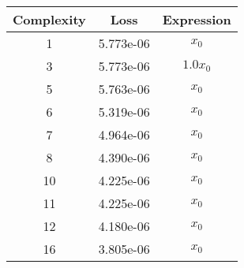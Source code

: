 \begin{center}
        \begin{tabular}{|c|c|c|}
        \hline
        Complexity & Loss & Expression \\
        \hline
        1 & 5.773e-06 & $\begin{aligned}x_{0}\end{aligned}$\\ \hline3 & 5.773e-06 & $\begin{aligned}1.0 x_{0}\end{aligned}$\\ \hline5 & 5.763e-06 & $\begin{aligned}x_{0}\end{aligned}$\\ \hline6 & 5.319e-06 & $\begin{aligned}x_{0}\end{aligned}$\\ \hline7 & 4.964e-06 & $\begin{aligned}x_{0}\end{aligned}$\\ \hline8 & 4.390e-06 & $\begin{aligned}x_{0}\end{aligned}$\\ \hline10 & 4.225e-06 & $\begin{aligned}x_{0}\end{aligned}$\\ \hline11 & 4.225e-06 & $\begin{aligned}x_{0}\end{aligned}$\\ \hline12 & 4.180e-06 & $\begin{aligned}x_{0}\end{aligned}$\\ \hline16 & 3.805e-06 & $\begin{aligned}x_{0}\end{aligned}$\\ \hline\end{tabular}
        \end{center}
        
